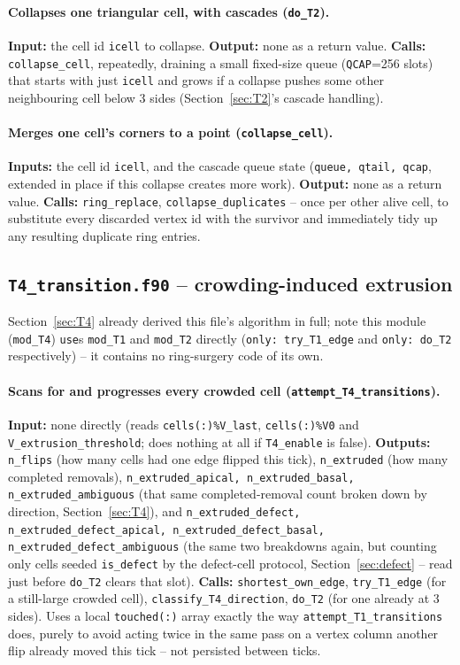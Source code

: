 \documentclass[11pt,a4paper]{report}
\begin{document}
\paragraph{Collapses one triangular cell, with cascades
(\texttt{do\_T2}).} \textbf{Input:} the cell id \texttt{icell} to
collapse. \textbf{Output:} none as a return value. \textbf{Calls:}
\texttt{collapse\_cell}, repeatedly, draining a small fixed-size queue
(\texttt{QCAP}=256 slots) that starts with just \texttt{icell} and
grows if a collapse pushes some other neighbouring cell below 3 sides
(Section~\ref{sec:T2}'s cascade handling).
\paragraph{Merges one cell's corners to a point
(\texttt{collapse\_cell}).} \textbf{Inputs:} the cell id
\texttt{icell}, and the cascade queue state (\texttt{queue, qtail,
qcap}, extended in place if this collapse creates more work).
\textbf{Output:} none as a return value. \textbf{Calls:}
\texttt{ring\_replace}, \texttt{collapse\_duplicates} -- once per other
alive cell, to substitute every discarded vertex id with the survivor
and immediately tidy up any resulting duplicate ring entries.

\subsection{\texttt{T4\_transition.f90} -- crowding-induced extrusion}
\label{sec:T4-code}
Section~\ref{sec:T4} already derived this file's algorithm in full;
note this module (\texttt{mod\_T4}) \texttt{use}s \texttt{mod\_T1} and
\texttt{mod\_T2} directly (\texttt{only: try\_T1\_edge} and
\texttt{only: do\_T2} respectively) -- it contains no ring-surgery code
of its own.
\paragraph{Scans for and progresses every crowded cell
(\texttt{attempt\_T4\_transitions}).} \textbf{Input:} none directly
(reads \texttt{cells(:)\%V\_last}, \texttt{cells(:)\%V0} and
\texttt{V\_extrusion\_threshold}; does nothing at all if
\texttt{T4\_enable} is false). \textbf{Outputs:} \texttt{n\_flips} (how
many cells had one edge flipped this tick), \texttt{n\_extruded} (how
many completed removals), \texttt{n\_extruded\_apical,
n\_extruded\_basal, n\_extruded\_ambiguous} (that same completed-removal
count broken down by direction, Section~\ref{sec:T4}), and
\texttt{n\_extruded\_defect, n\_extruded\_defect\_apical,
n\_extruded\_defect\_basal, n\_extruded\_defect\_ambiguous} (the same
two breakdowns again, but counting only cells seeded
\texttt{is\_defect} by the defect-cell protocol, Section~\ref{sec:defect}
-- read just before \texttt{do\_T2} clears that slot). \textbf{Calls:}
\texttt{shortest\_own\_edge}, \texttt{try\_T1\_edge} (for a still-large
crowded cell), \texttt{classify\_T4\_direction}, \texttt{do\_T2} (for
one already at 3 sides). Uses a local \texttt{touched(:)} array
exactly the way \texttt{attempt\_T1\_transitions} does, purely to avoid
acting twice in the same pass on a vertex column another flip already
moved this tick -- not persisted between ticks.
\end{document}
